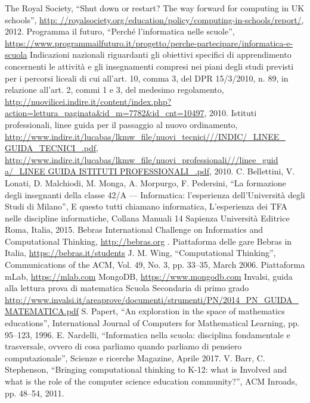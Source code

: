 \documentclass[12pt]{report}
\begin{document}
\begin{thebibliography}{00}
%
The Royal Society, ``Shut down or restart? The way forward for computing in UK schools'', \url{http: //royalsociety.org/education/policy/computing-in-schools/report/}, 2012.
%
Programma il futuro, ``Perché l'informatica nelle scuole'',
\url{https://www.programmailfuturo.it/progetto/perche-partecipare/informatica-e-scuola}
%
Indicazioni nazionali riguardanti gli obiettivi specifici di apprendimento concernenti le attività e gli insegnamenti compresi nei piani degli studi previsti per i percorsi liceali di cui all'art. 10, comma 3, del DPR 15/3/2010, n. 89, in relazione all'art. 2, commi 1 e 3, del medesimo regolamento, \url{http://nuovilicei.indire.it/content/index.php?action=lettura_paginata&id_m=7782&id_cnt=10497}, 2010.
%
Istituti professionali, linee guida per il passaggio al nuovo ordinamento, \url{http://www.indire.it/lucabas/lkmw_file/nuovi_tecnici///INDIC/_LINEE_ GUIDA_TECNICI_.pdf}, \url{http://www.indire.it/lucabas/lkmw_file/nuovi_professionali///linee_guid a/_LINEE GUIDA ISTITUTI PROFESSIONALI_.pdf}, 2010.
%
C. Bellettini, V. Lonati, D. Malchiodi, M. Monga, A. Morpurgo, F. Pedersini, ``La formazione degli insegnanti della classe 42/A --- Informatica: l'esperienza dell'Università degli Studi di Milano'', 
E questo tutti chiamano informatica, L'esperienza dei TFA nelle discipline informatiche, 
Collana Manuali 14 Sapienza Università Editrice Roma, Italia,
2015.
%
Bebras International Challenge on Informatics and Computational Thinking, \url{http://bebras.org} .
%
Piattaforma delle gare Bebras in Italia, \url{https://bebras.it/students}
%
J. M. Wing, ``Computational Thinking”, Communications of the ACM, 
Vol. 49, No. 3, pp. 33–35,
March 
2006.
%
Piattaforma mLab, \url{https://mlab.com}
%
MongoDB, \url{https://www.mongodb.com}
%
Invalsi, guida alla lettura prova di matematica Scuola Secondaria di primo grado \url{http://www.invalsi.it/areaprove/documenti/strumenti/PN/2014_PN_GUIDA_MATEMATICA.pdf}
%
S. Papert, ``An exploration in the space of mathematics educations'',
International Journal of Computers for Mathematical Learning, 
pp. 95–123, 
1996.
%
E. Nardelli, ``Informatica nella scuola: disciplina fondamentale e trasversale, ovvero di cosa parliamo quando parliamo di pensiero computazionale'',
Scienze e ricerche Magazine,
Aprile 2017.
%
V. Barr, C. Stephenson, ``Bringing computational thinking to K-12: what is Involved and what is the role of the computer science education community?'', 
ACM Inroads, 
pp. 48–54,
2011.
%
\end{thebibliography}


% 
%

\end{document}
